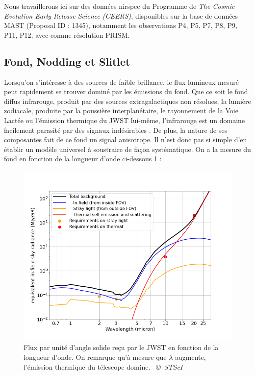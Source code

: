 \documentclass[11pt, a4paper]{article}
\newcommand{\customcite}[2]{\mbox{
  {\small \copyright} \textit{#1} \cite{#2}}
}
\begin{document}
Nous travaillerons ici sur des données \gls{nirspec} du Programme de \textit{The Cosmic Evolution Early Release Science (CEERS)}, disponibles sur la base de données MAST \cite{portal_mast} (Proposal ID : 1345), notamment les observations P4, P5, P7, P8, P9, P11, P12, avec comme résolution PRISM.

\subsection{Fond, Nodding et Slitlet}

Lorsqu'on s'intéresse à des sources de faible brillance, le flux lumineux mesuré peut rapidement se trouver dominé par les émissions du fond. Que ce soit le fond diffus infrarouge, produit par des sources extragalactiques non résolues, la lumière zodiacale, produite par la poussière interplanétaire, le rayonnement de la Voie Lactée ou l'émission thermique du JWST lui-même, l'infrarouge est un domaine facilement parasité par des signaux indésirables \cite{jwst_background}. De plus, la nature de ses composantes fait de ce fond un signal anisotrope. Il n'est donc pas si simple d'en établir un modèle universel à soustraire de façon systématique. On a la mesure du fond en fonction de la longueur d'onde ci-dessous \ref{fig:background_jwst} : 

\begin{figure}[!h]
  \centering
  \includegraphics[scale=0.55]{assets/background_jwst.png}
  \caption{Flux par unité d'angle solide reçu par le JWST en fonction de la longueur d'onde. On remarque qu'à mesure que $\lambda$ augmente, l'émission thermique du télescope domine. \customcite{STScI}{jwst_background}}
  \label{fig:background_jwst}
\end{figure}
\end{document}
